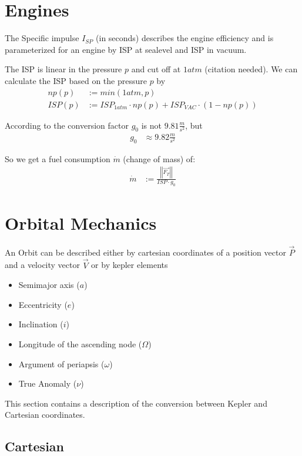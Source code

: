 \documentclass[11pt]{article}
\newcommand{\oa}[1]{\overrightarrow{#1}}
\newcommand{\Pos}{\oa{P}}
\newcommand{\Vel}{\oa{V}}
\newcommand{\absvec}[1]{\left|\left|{#1}\right|\right|}
\begin{document}
\section{Engines}

The Specific impulse $I_{SP}$ (in seconds) describes the engine
efficiency and is parameterized for an engine by ISP at sealevel and
ISP in vacuum.

The ISP is linear in the pressure $p$ and cut off at $1atm$
(citation needed).  We can calculate the ISP based on the pressure
$p$ by
\begin{align}
  np(p) &:= min(1 atm, p)\\
  ISP(p) &:= ISP_{1atm} \cdot np(p) + ISP_{VAC} \cdot (1-np(p))
\end{align}

According to \cite{ECF} the conversion factor $g_0$ is not
$9.81\frac{m}{s^2}$, but
\begin{align}
  g_0 &\approx 9.82\frac{m}{s^2}
\end{align}

So we get a fuel consumption $\dot{m}$ (change of mass) \cite{SPI} of:
\begin{align}
\dot{m} & := \frac{\absvec{\oa{F_T}}}{ISP \cdot g_0}
\end{align}


\section{Orbital Mechanics}

An Orbit can be described either by cartesian coordinates of a
position vector $\Pos$ and a velocity vector $\Vel$ or by kepler
elements \cite{Kepler}

\begin{itemize}
\item Semimajor axis ($a$)
\item Eccentricity ($e$)
\item Inclination ($i$)
\item Longitude of the ascending node ($\Omega$)
\item Argument of periapsis ($\omega$)
\item True Anomaly ($\nu$)
\end{itemize}

This section contains a description of the conversion between Kepler
and Cartesian coordinates.

\subsection{Cartesian}
\end{document}
